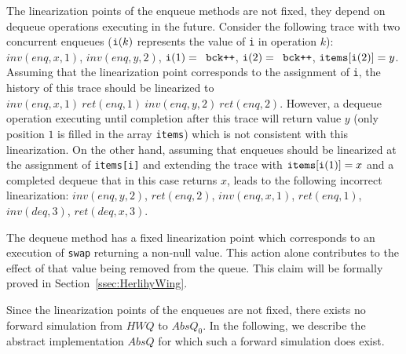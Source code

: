 The linearization points of the enqueue methods are not fixed, they depend on dequeue operations executing in the future. Consider the following trace with two concurrent enqueues (${\tt i}(k)$ represents the value of {\tt i} in operation $k$): $inv(enq,x,1)$, $inv(enq,y,2)$, ${\tt i}(1) = \mbox{{\tt bck++}}$, ${\tt i}(2) = \mbox{{\tt bck++}}$, ${\tt items[i(}2{\tt )]} = y$.
Assuming that the linearization point corresponds to the assignment of {\tt i}, the history of this trace should be linearized to $inv(enq,x,1)\ ret(enq,1)\ inv(enq,y,2)\ ret(enq,2)$. However, a dequeue operation executing until completion after this trace will return value $y$ (only position $1$ is filled in the array {\tt items}) which is not consistent with this linearization. On the other hand, assuming that enqueues should be linearized at the assignment of {\tt items[i]} and extending the trace with ${\tt items[i(}1{\tt )]} = x$ and a completed dequeue that in this case returns $x$, leads to the following incorrect linearization: $inv(enq,y,2)$, $ret(enq,2)$, $inv(enq,x,1)$, $ret(enq,1)$, $inv(deq,3)$, $ret(deq,x,3)$.

The dequeue method has a fixed linearization point which corresponds to an execution of {\tt swap} returning a non-null value. This action alone contributes to the effect of that value being removed from the queue. This claim will be formally proved in Section~\ref{ssec:HerlihyWing}.

Since the linearization points of the enqueues are not fixed, there exists no forward simulation from $\mathit{HWQ}$ to $AbsQ_0$. 
In the following, we describe the abstract implementation $AbsQ$ for which such a forward simulation does exist.

